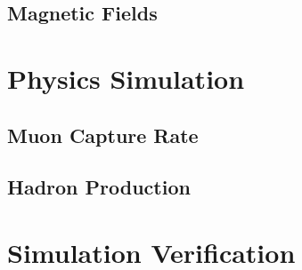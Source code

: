 \section{Magnetic Fields} %
\label{sec:magnetic_fields}

\chapter{Physics Simulation} %
\label{cha:physics_simulation}
\section{Muon Capture Rate} %
\label{sec:muon_capture_rate}

\section{Hadron Production} %
\label{sec:hadron_production}

\chapter{Simulation Verification} %
\label{cha:simulation_verification}

